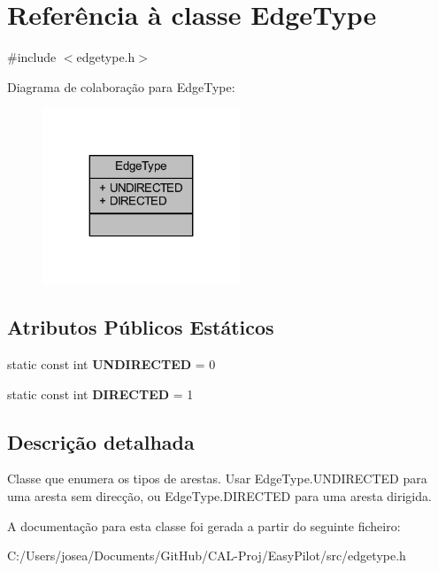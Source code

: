 \hypertarget{class_edge_type}{}\section{Referência à classe Edge\+Type}
\label{class_edge_type}


{\ttfamily \#include $<$edgetype.\+h$>$}



Diagrama de colaboração para Edge\+Type\+:
\nopagebreak
\begin{figure}[H]
\begin{center}
\leavevmode
\includegraphics[width=167pt]{class_edge_type__coll__graph}
\end{center}
\end{figure}
\subsection*{Atributos Públicos Estáticos}
\begin{DoxyCompactItemize}
\item 
\hypertarget{class_edge_type_a6533cc56d05c288a550b9980b66c9317}{}static const int {\bfseries U\+N\+D\+I\+R\+E\+C\+T\+E\+D} = 0\label{class_edge_type_a6533cc56d05c288a550b9980b66c9317}

\item 
\hypertarget{class_edge_type_a903017a534f2818c2d17145e4ae0321c}{}static const int {\bfseries D\+I\+R\+E\+C\+T\+E\+D} = 1\label{class_edge_type_a903017a534f2818c2d17145e4ae0321c}

\end{DoxyCompactItemize}


\subsection{Descrição detalhada}
Classe que enumera os tipos de arestas. Usar Edge\+Type.\+U\+N\+D\+I\+R\+E\+C\+T\+E\+D para uma aresta sem direcção, ou Edge\+Type.\+D\+I\+R\+E\+C\+T\+E\+D para uma aresta dirigida. 

A documentação para esta classe foi gerada a partir do seguinte ficheiro\+:\begin{DoxyCompactItemize}
\item 
C\+:/\+Users/josea/\+Documents/\+Git\+Hub/\+C\+A\+L-\/\+Proj/\+Easy\+Pilot/src/edgetype.\+h\end{DoxyCompactItemize}
